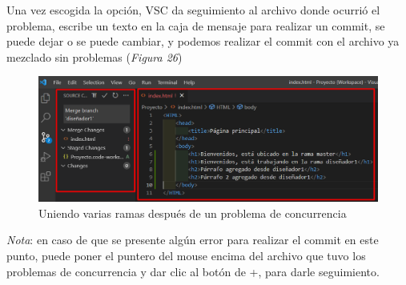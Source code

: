 Una vez escogida la opción, VSC da seguimiento al archivo donde ocurrió el problema, escribe un texto en la caja de mensaje para realizar un commit, se puede dejar o se puede cambiar, y podemos realizar el commit con el archivo ya mezclado sin problemas (\textit{Figura 26})
\begin{figure}[H]
    \begin{center}
        \caption{Uniendo varias ramas después de un problema de concurrencia}
        \label{fig: 26}
        \includegraphics[width=12cm]{capturas/merge4.png}
    \end{center}
\end{figure}
\textit{Nota}: en caso de que se presente algún error para realizar el commit en este punto, puede poner el puntero del mouse encima del archivo que tuvo los problemas de concurrencia y dar clic al botón de +, para darle seguimiento.




